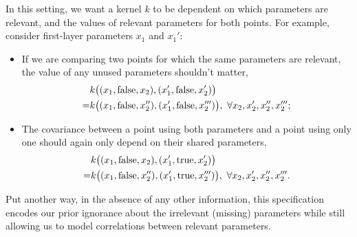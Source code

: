 \documentclass{article}
\renewcommand{\vec}[1]{\mathbf{#1}}
\begin{document}
In this setting, we want a kernel $k$ to be dependent on which parameters are relevant, and the values of relevant parameters for both points. For example, consider first-layer parameters $x_1$ and $x_1'$:
%
\begin{itemize}[leftmargin=0.8cm]
\item If we are comparing two points for which the same parameters are relevant, the value of any unused parameters shouldn't matter,  
\begin{align}
 & k\bigl((x_1, \textnormal{false}, x_2), (x_1', \textnormal{false}, x_2') \bigr) \nonumber\\
= & k\bigl((x_1, \textnormal{false}, x_2''), (x_1', \textnormal{false}, x_2''')\bigr),\ 
\forall x_2, x_2', x_2'', x_2''';
\end{align}
\item The covariance between a point using both parameters and a point using only one should again only depend on their shared parameters,
\begin{align}
 & k\bigl((x_1, \textnormal{false}, x_2), (x_1', \textnormal{true}, x_2') \bigr) \nonumber\\
= & k\bigl((x_1, \textnormal{false}, x_2''), (x_1', \textnormal{true}, x_2''')\bigr),\ 
\forall x_2, x_2', x_2'', x_2'''.
\end{align}
\end{itemize}

Put another way, in the absence of any other information, this specification encodes our prior ignorance about the irrelevant (missing) parameters while still allowing us to model correlations between relevant parameters.
%
\end{document}
